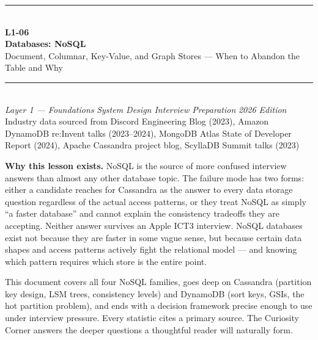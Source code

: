 \documentclass[11pt,a4paper]{article}
\begin{document}
\begin{titlepage}
\vspace*{2cm}
\begin{center}
  {\color{primary}\rule{\linewidth}{3pt}}\\[12pt]
  {\huge\bfseries\color{highlight} L1-06}\\[6pt]
  {\Huge\bfseries\color{primary} Databases: NoSQL}\\[10pt]
  {\large\color{primary!70} Document, Columnar, Key-Value, and Graph Stores --- When to Abandon the Table and Why}\\[20pt]
  {\color{primary}\rule{\linewidth}{1pt}}\\[16pt]
  {\normalsize\color{primary!70}
    \textit{Layer 1 --- Foundations} \quad\textbullet\quad
    \textit{System Design Interview Preparation} \quad\textbullet\quad
    \textit{2026 Edition}
  }\\[8pt]
  {\small\color{primary!60} Industry data sourced from Discord Engineering Blog (2023), Amazon DynamoDB re:Invent talks (2023--2024), MongoDB Atlas State of Developer Report (2024), Apache Cassandra project blog, ScyllaDB Summit talks (2023)}
\end{center}
\vfill
\begin{insightbox}
\textbf{Why this lesson exists.} NoSQL is the source of more confused interview answers than almost any other database topic. The failure mode has two forms: either a candidate reaches for Cassandra as the answer to every data storage question regardless of the actual access patterns, or they treat NoSQL as simply ``a faster database'' and cannot explain the consistency tradeoffs they are accepting. Neither answer survives an Apple ICT3 interview. NoSQL databases exist not because they are faster in some vague sense, but because certain data shapes and access patterns actively fight the relational model --- and knowing which pattern requires which store is the entire point.

This document covers all four NoSQL families, goes deep on Cassandra (partition key design, LSM trees, consistency levels) and DynamoDB (sort keys, GSIs, the hot partition problem), and ends with a decision framework precise enough to use under interview pressure. Every statistic cites a primary source. The Curiosity Corner answers the deeper questions a thoughtful reader will naturally form.
\end{insightbox}
\vspace{1cm}
\tableofcontents
\end{titlepage}
\end{document}
